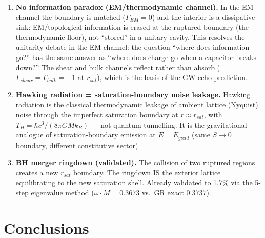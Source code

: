 \begin{enumerate}
    \item \textbf{No information paradox (EM/thermodynamic channel).}
    In the EM channel the boundary is matched ($\Gamma_{EM} = 0$) and the
    interior is a dissipative sink: EM/topological information is erased at
    the ruptured boundary (the thermodynamic floor), not ``stored'' in a
    unitary cavity. This resolves the unitarity debate in the EM channel:
    the question ``where does information go?'' has the same answer
    as ``where does charge go when a capacitor breaks down?'' The shear and
    bulk channels reflect rather than absorb ($\Gamma_{shear} = \Gamma_{bulk}
    = -1$ at $r_{sat}$), which is the basis of the GW-echo prediction.

    \item \textbf{Hawking radiation = saturation-boundary noise leakage.}
    Hawking radiation is the classical thermodynamic leakage of ambient
    lattice (Nyquist) noise through the imperfect saturation boundary at
    $r \approx r_{sat}$, with $T_H = \hbar c^3/(8\pi G M k_B)$ --- not
    quantum tunnelling. It is the gravitational analogue of
    saturation-boundary emission at $E = E_{yield}$ (same $S \to 0$
    boundary, different constitutive sector).

    \item \textbf{BH merger ringdown (validated).}
    The collision of two ruptured regions creates a new $r_{sat}$ boundary.
    The ringdown IS the exterior lattice equilibrating to the new
    saturation shell. Already validated to 1.7\% via the 5-step
    eigenvalue method ($\omega \cdot M = 0.3673$ vs.\ GR exact $0.3737$).
\end{enumerate}

\section{Conclusions}

